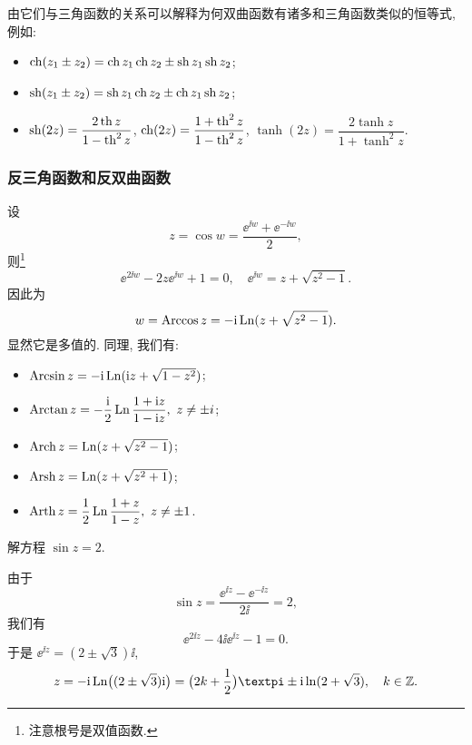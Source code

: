 由它们与三角函数的关系可以解释为何双曲函数有诸多和三角函数类似的恒等式, 例如:

\begin{itemize}[addsep]
  \item $\operatorname{ch}(z_1\pm z_2)=\operatorname{ch} z_1 \operatorname{ch} z_2\pm\operatorname{sh} z_1 \operatorname{sh} z_2$;
  \item $\operatorname{sh}(z_1\pm z_2)=\operatorname{sh} z_1 \operatorname{ch} z_2\pm\operatorname{ch} z_1 \operatorname{sh} z_2$;
  \item $\operatorname{sh}(2z)=\dfrac{2\operatorname{th} z}{1-\operatorname{th}^2 z}$, $\operatorname{ch}(2z)=\dfrac{1+\operatorname{th}^2 z}{1-\operatorname{th}^2 z}$, $\tanh(2z)=\dfrac{2\tanh z}{1+\tanh^2 z}$.
\end{itemize}


\subsubsection{反三角函数和反双曲函数}

设
\[
  z=\cos w=\frac{\ee^{\ii w}+\ee^{-\ii w}}2,\]
则\footnote{注意根号是双值函数.}
\[
  \ee^{2\ii w}-2z\ee^{\ii w}+1=0,\quad
  \ee^{\ii w}=z+\sqrt{z^2-1}.
\]
因此为 
\[
  w=\operatorname{Arccos} z=-\mathrm{i} \operatorname{Ln}(z+\sqrt{z^2-1}).
\]
显然它是多值的. 同理, 我们有:

\begin{itemize}[addsep]
  \item {} $\operatorname{Arcsin} z=-\mathrm{i}\operatorname{Ln}(\mathrm{i} z+\sqrt{1-z^2})$;
  \item {} $\operatorname{Arctan} z=-\dfrac {\mathrm{i}} 2\operatorname{Ln}\dfrac{1+\mathrm{i} z}{1-\mathrm{i} z},\ z\neq \pm i$;
  \item {} $\operatorname{Arch} z=\operatorname{Ln}(z+\sqrt{z^2-1})$;
  \item {} $\operatorname{Arsh} z=\operatorname{Ln}(z+\sqrt{z^2+1})$;
  \item {} $\Arth z=\dfrac12\Ln\dfrac{1+z}{1-z},\ z\neq \pm1$.
\end{itemize}

\begin{example}
  解方程 $\sin z=2$.
\end{example}

\begin{solution}
  由于
  \[
    \sin z=\frac{\ee^{\ii z}-\ee^{-\ii z}}{2\ii}=2,
  \]
  我们有
  \[
    \ee^{2\ii z}-4\ii\ee^{\ii z}-1=0.
  \]
  于是 $\ee^{\ii z}=(2\pm\sqrt 3)\ii$,
  \[
     z
    =-\ii\Ln\bigl((2\pm\sqrt 3)\ii\bigr)
    =\bigl(2k+\half\bigr)\cpi\pm \ii\ln(2+\sqrt3),
      \quad k\in\BZ.
  \]
\end{solution}


